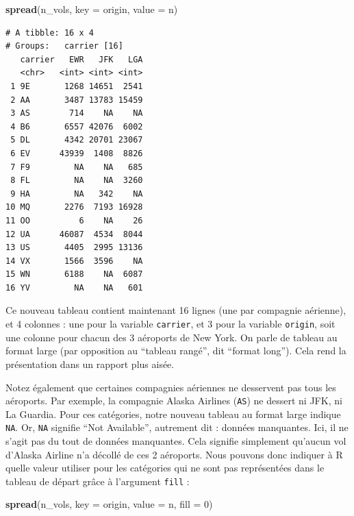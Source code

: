 \documentclass[a4paperpaper,]{article}
\newenvironment{Shaded}{\begin{snugshade}}{\end{snugshade}}
\newcommand{\KeywordTok}[1]{\textcolor[rgb]{0.13,0.29,0.53}{\textbf{#1}}}
\newcommand{\DataTypeTok}[1]{\textcolor[rgb]{0.13,0.29,0.53}{#1}}
\newcommand{\DecValTok}[1]{\textcolor[rgb]{0.00,0.00,0.81}{#1}}
\newcommand{\NormalTok}[1]{#1}
\theoremstyle{definition}
\theoremstyle{definition}
\theoremstyle{definition}
\theoremstyle{remark}
\begin{document}
\begin{Shaded}
\begin{Highlighting}[]
\KeywordTok{spread}\NormalTok{(n_vols, }\DataTypeTok{key =}\NormalTok{ origin, }\DataTypeTok{value =}\NormalTok{ n)}
\end{Highlighting}
\end{Shaded}

\begin{verbatim}
# A tibble: 16 x 4
# Groups:   carrier [16]
   carrier   EWR   JFK   LGA
   <chr>   <int> <int> <int>
 1 9E       1268 14651  2541
 2 AA       3487 13783 15459
 3 AS        714    NA    NA
 4 B6       6557 42076  6002
 5 DL       4342 20701 23067
 6 EV      43939  1408  8826
 7 F9         NA    NA   685
 8 FL         NA    NA  3260
 9 HA         NA   342    NA
10 MQ       2276  7193 16928
11 OO          6    NA    26
12 UA      46087  4534  8044
13 US       4405  2995 13136
14 VX       1566  3596    NA
15 WN       6188    NA  6087
16 YV         NA    NA   601
\end{verbatim}

Ce nouveau tableau contient maintenant 16 lignes (une par compagnie
aérienne), et 4 colonnes : une pour la variable \texttt{carrier}, et 3
pour la variable \texttt{origin}, soit une colonne pour chacun des 3
aéroports de New York. On parle de tableau au format large (par
opposition au ``tableau rangé'', dit ``format long''). Cela rend la
présentation dans un rapport plus aisée.

Notez également que certaines compagnies aériennes ne desservent pas
tous les aéroports. Par exemple, la compagnie Alaska Airlines
(\texttt{AS}) ne dessert ni JFK, ni La Guardia. Pour ces catégories,
notre nouveau tableau au format large indique \texttt{NA}. Or,
\texttt{NA} signifie ``Not Available'', autrement dit : données
manquantes. Ici, il ne s'agit pas du tout de données manquantes. Cela
signifie simplement qu'aucun vol d'Alaska Airline n'a décollé de ces 2
aéroports. Nous pouvons donc indiquer à R quelle valeur utiliser pour
les catégories qui ne sont pas représentées dans le tableau de départ
grâce à l'argument \texttt{fill} :

\begin{Shaded}
\begin{Highlighting}[]
\KeywordTok{spread}\NormalTok{(n_vols, }\DataTypeTok{key =}\NormalTok{ origin, }\DataTypeTok{value =}\NormalTok{ n, }\DataTypeTok{fill =} \DecValTok{0}\NormalTok{)}
\end{Highlighting}
\end{Shaded}
\end{document}
